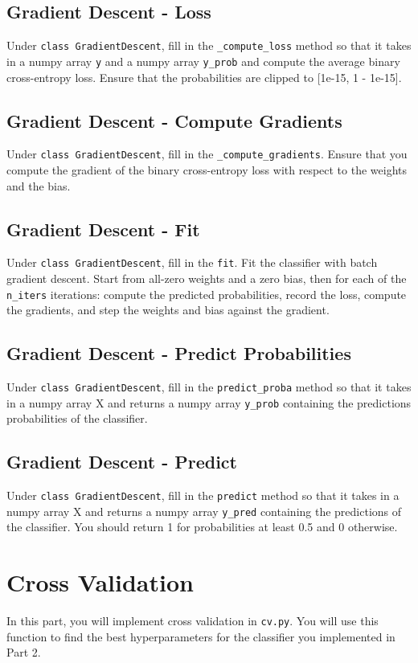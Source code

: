 \documentclass{article}
\begin{document}
\subsection{Gradient Descent - Loss}

Under \verb|class GradientDescent|, fill in the \verb|_compute_loss| method so that it takes in a numpy array \verb|y| and a numpy array \verb|y_prob| and compute the average binary cross-entropy loss. Ensure that the probabilities are clipped to [1e-15, 1 - 1e-15]. 

\subsection{Gradient Descent - Compute Gradients}
Under \verb|class GradientDescent|, fill in the \verb|_compute_gradients|. Ensure that you compute the gradient of the binary cross-entropy loss with respect to the weights and the bias.

\subsection{Gradient Descent - Fit}
Under \verb|class GradientDescent|, fill in the \verb|fit|. Fit the classifier with batch gradient descent. Start from all-zero weights and a zero bias, then for each of the \verb|n_iters| iterations: compute the predicted probabilities, record the loss, compute the gradients, and step the weights and bias against the gradient.


\subsection{Gradient Descent - Predict Probabilities}
Under \verb|class GradientDescent|, fill in the \verb|predict_proba| method so that it takes in a numpy array X and returns a numpy array \verb|y_prob| containing the predictions probabilities of the  classifier.

\subsection{Gradient Descent - Predict}
Under \verb|class GradientDescent|, fill in the \verb|predict| method so that it takes in a numpy array X and returns a numpy array \verb|y_pred| containing the predictions of the classifier. You should return 1 for probabilities at least 0.5 and 0 otherwise.

\section{  Cross Validation}
In this part, you will implement cross validation in \verb|cv.py|. You will use this function to find the best hyperparameters for the classifier you implemented in Part 2.
\end{document}
